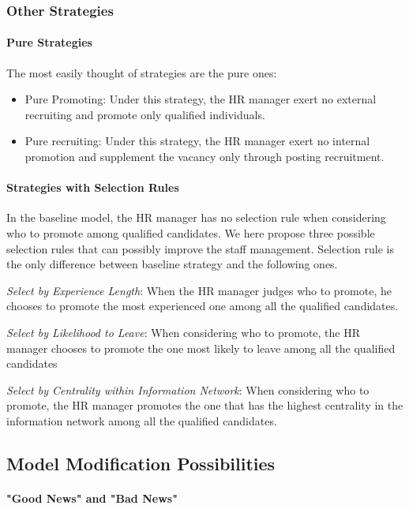 \documentclass[tcn = 37075, sheet = true, abstract = true]{mcmthesis}
\begin{document}
\subsubsection{Other Strategies}

\paragraph{Pure Strategies}
The most easily thought of strategies are the pure ones:
\begin{itemize}
\item Pure Promoting: Under this strategy, the HR manager exert no external recruiting and promote only qualified individuals.
\item Pure recruiting: Under this strategy, the HR manager exert no internal promotion and supplement the vacancy only through posting recruitment.
\end{itemize}

\paragraph{Strategies with Selection Rules}

In the baseline model, the HR manager has no selection rule when considering who to promote among qualified candidates. We here propose three possible selection rules that can possibly improve the staff management. Selection rule is the only difference between baseline strategy and the following ones.

\textit{Select by Experience Length}: When the HR manager judges who to promote, he chooses to promote the most experienced one among all the qualified candidates.

\textit{Select by Likelihood to Leave}: When considering who to promote, the HR manager chooses to promote the one most likely to leave among all the qualified candidates

\textit{Select by Centrality within Information Network}: When considering who to promote, the HR manager promotes the one that has the highest centrality in the information network among all the qualified candidates.


\subsection{Model Modification Possibilities}

\paragraph{"Good News" and "Bad News"}
\end{document}
